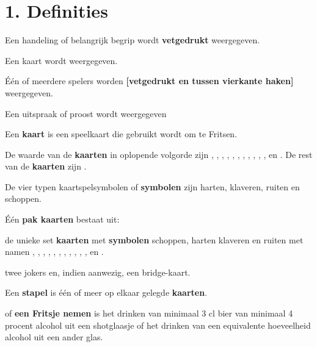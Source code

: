 \newpage
\drawBar{}

\vspace{-0.5cm}
\section*{1. Definities}

\item Een handeling of belangrijk begrip wordt \textbf{vetgedrukt} weergegeven.

\item Een kaart wordt  weergegeven.

\item Één of meerdere spelers worden \textbf{[vetgedrukt en tussen vierkante haken]} weergegeven.

\item Een uitspraak of proost wordt  weergegeven 

\item Een \textbf{kaart} is een speelkaart die gebruikt wordt om te Fritsen.

\item \label{item:kaarten_2} De waarde van de \textbf{kaarten} in oplopende volgorde zijn , , , , , , , , , , ,  en . De rest van de \textbf{kaarten} zijn .

\item De vier typen kaartspelsymbolen of \textbf{symbolen} zijn harten, klaveren, ruiten en schoppen. 

\item \label{item:kaarten} \'E\'en \textbf{pak kaarten} bestaat uit: 
    \puntLijst{}
        \item de unieke set \textbf{kaarten} met \textbf{symbolen} schoppen, harten klaveren en ruiten met namen , , , , , , , , , , ,  en .
        \item twee jokers en, indien aanwezig, een bridge-kaart.
    \eindPuntLijst{}

\item Een \textbf{stapel} is één of meer op elkaar gelegde \textbf{kaarten}.

\item \label{def:fritsen} \Fritsen of \textbf{een Fritsje nemen} is het drinken van minimaal 3 cl bier van minimaal 4 procent alcohol uit een shotglaasje of het drinken van een equivalente hoeveelheid alcohol uit een ander glas.

